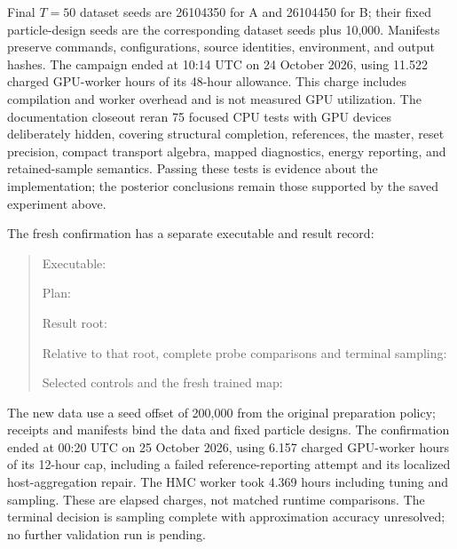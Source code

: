 Final $T=50$ dataset seeds are 26104350 for A and 26104450 for B; their fixed
particle-design seeds are the corresponding dataset seeds plus 10,000.
Manifests preserve commands, configurations, source identities, environment,
and output hashes.  The campaign ended at 10:14 UTC on 24 October 2026,
using 11.522 charged GPU-worker hours of its 48-hour allowance.  This charge
includes compilation and worker overhead and is not measured GPU utilization.
The documentation closeout reran 75 focused CPU tests with GPU devices
deliberately hidden, covering structural completion, references, the master,
reset precision, compact transport algebra, mapped diagnostics, energy
reporting, and retained-sample semantics.  Passing these tests is evidence
about the implementation; the posterior conclusions remain those supported
by the saved experiment above.

The fresh confirmation has a separate executable and result record:
\begin{quote}\small\raggedright
Executable:\par
{}\par
Plan:\par
{}\par
Result root:\par
{}\par
Relative to that root, complete probe comparisons and terminal sampling:\par
{}\par
{}\par
Selected controls and the fresh trained map:\par
{}\par
{}
\end{quote}
The new data use a seed offset of 200,000 from the original preparation
policy; receipts and manifests bind the data and fixed particle designs.
The confirmation ended at 00:20 UTC on 25 October 2026, using 6.157 charged
GPU-worker hours of its 12-hour cap, including a failed reference-reporting
attempt and its localized host-aggregation repair.  The HMC worker took
4.369 hours including tuning and sampling.  These are elapsed charges,
not matched runtime comparisons.  The terminal decision is sampling complete
with approximation accuracy unresolved; no further validation run is pending.
